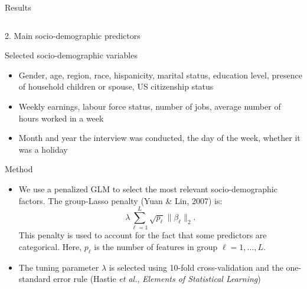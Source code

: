\documentclass[final]{beamer}
\newcounter{acolumn}%
\def\autoheight{\vspace*{0pt}}%
\begin{document}
\begin{frame}
\begin{acolumns}[t]
\begin{column}{.72\linewidth}
\begin{block}{Results}
\begin{figure}
      \end{figure}
     
          
       
      \autoheight 
     \end{block}
     
                     
    \end{column}
              
    
    \begin{column}{.24\linewidth}
    \begin{center}
    	\LARGE{2. Main socio-demographic predictors}
    \end{center}
    
    \begin{block}{Selected socio-demographic variables}
                    \begin{itemize}
                    	\item Gender, age, region, race, hispanicity, marital status, education level, presence of household children or spouse, US citizenship status
                    	
                    	\item Weekly earnings, labour force status, number of jobs, average number of hours worked in a week
                    	
                    	\item Month and year the interview was conducted, the day of the week, whether it was a holiday
                    	
                    \end{itemize}
                                 
                    
                   \end{block}
                      
                  
    
     \begin{block}{Method}
     	\begin{itemize}
     		\item We use a penalized GLM to select the most relevant socio-demographic factors. The group-Lasso penalty (Yuan \& Lin, 2007) is:
     		$$\lambda \sum_{\ell=1}^{L}\sqrt{p_\ell}\|\beta_\ell\|_2.$$
     		This penalty is used to account for the fact that some predictors are categorical. Here, $p_\ell$ is the number of features in group $\ell=1,\ldots,L$.
     		\item The tuning parameter $\lambda$ is selected using 10-fold cross-validation and the one-standard error rule (Hastie \emph{et al.}, \emph{Elements of Statistical Learning})
     	\end{itemize}
        

\end{block}
\end{column}
\end{acolumns}
\end{frame}
\end{document}
